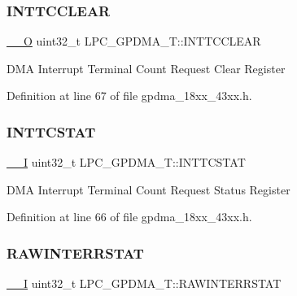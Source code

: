 \subsubsection{\texorpdfstring{I\+N\+T\+T\+C\+C\+L\+E\+AR}{INTTCCLEAR}}
{\footnotesize\ttfamily \hyperlink{core__sc300_8h_a7e25d9380f9ef903923964322e71f2f6}{\+\_\+\+\_\+O} uint32\+\_\+t L\+P\+C\+\_\+\+G\+P\+D\+M\+A\+\_\+\+T\+::\+I\+N\+T\+T\+C\+C\+L\+E\+AR}

D\+MA Interrupt Terminal Count Request Clear Register 

Definition at line 67 of file gpdma\+\_\+18xx\+\_\+43xx.\+h.

\mbox{\label{struct_l_p_c___g_p_d_m_a___t_a2ca8f15773342988a28ba333cf73c380}} 
\subsubsection{\texorpdfstring{I\+N\+T\+T\+C\+S\+T\+AT}{INTTCSTAT}}
{\footnotesize\ttfamily \hyperlink{core__sc300_8h_af63697ed9952cc71e1225efe205f6cd3}{\+\_\+\+\_\+I} uint32\+\_\+t L\+P\+C\+\_\+\+G\+P\+D\+M\+A\+\_\+\+T\+::\+I\+N\+T\+T\+C\+S\+T\+AT}

D\+MA Interrupt Terminal Count Request Status Register 

Definition at line 66 of file gpdma\+\_\+18xx\+\_\+43xx.\+h.

\mbox{\label{struct_l_p_c___g_p_d_m_a___t_ae4bf6971c867a0892da2cf449c341122}} 
\subsubsection{\texorpdfstring{R\+A\+W\+I\+N\+T\+E\+R\+R\+S\+T\+AT}{RAWINTERRSTAT}}
{\footnotesize\ttfamily \hyperlink{core__sc300_8h_af63697ed9952cc71e1225efe205f6cd3}{\+\_\+\+\_\+I} uint32\+\_\+t L\+P\+C\+\_\+\+G\+P\+D\+M\+A\+\_\+\+T\+::\+R\+A\+W\+I\+N\+T\+E\+R\+R\+S\+T\+AT}

